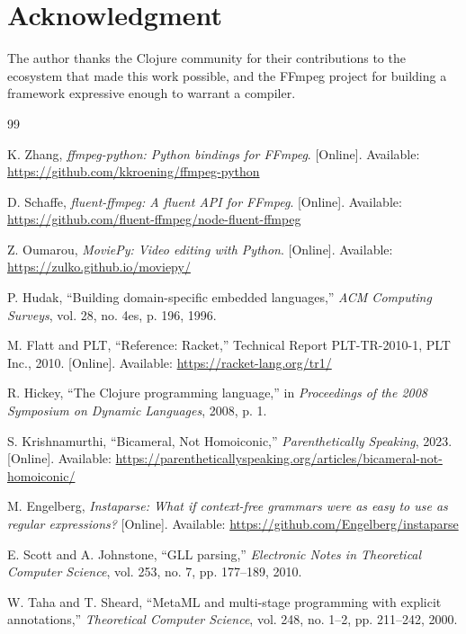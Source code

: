 \documentclass[conference]{IEEEtran}
\begin{document}
\section*{Acknowledgment}

The author thanks the Clojure community for their contributions to the ecosystem that made this work possible, and the FFmpeg project for building a framework expressive enough to warrant a compiler.




\begin{thebibliography}{99}

K. Zhang, \emph{ffmpeg-python: Python bindings for FFmpeg}.
[Online]. Available: \url{https://github.com/kkroening/ffmpeg-python}

D. Schaffe, \emph{fluent-ffmpeg: A fluent API for FFmpeg}.
[Online]. Available: \url{https://github.com/fluent-ffmpeg/node-fluent-ffmpeg}

Z. Oumarou, \emph{MoviePy: Video editing with Python}.
[Online]. Available: \url{https://zulko.github.io/moviepy/}

P. Hudak, ``Building domain-specific embedded languages,''
\emph{ACM Computing Surveys}, vol. 28, no. 4es, p. 196, 1996.

M. Flatt and PLT, ``Reference: Racket,''
Technical Report PLT-TR-2010-1, PLT Inc., 2010.
[Online]. Available: \url{https://racket-lang.org/tr1/}

R. Hickey, ``The Clojure programming language,''
in \emph{Proceedings of the 2008 Symposium on Dynamic Languages}, 2008, p. 1.

S. Krishnamurthi, ``Bicameral, Not Homoiconic,''
\emph{Parenthetically Speaking}, 2023.
[Online]. Available: \url{https://parentheticallyspeaking.org/articles/bicameral-not-homoiconic/}

M. Engelberg, \emph{Instaparse: What if context-free grammars were as easy to use as regular expressions?}
[Online]. Available: \url{https://github.com/Engelberg/instaparse}

E. Scott and A. Johnstone, ``GLL parsing,''
\emph{Electronic Notes in Theoretical Computer Science},
vol. 253, no. 7, pp. 177--189, 2010.

W. Taha and T. Sheard, ``MetaML and multi-stage programming with explicit annotations,''
\emph{Theoretical Computer Science}, vol. 248, no. 1--2, pp. 211--242, 2000.


\end{thebibliography}
\end{document}
